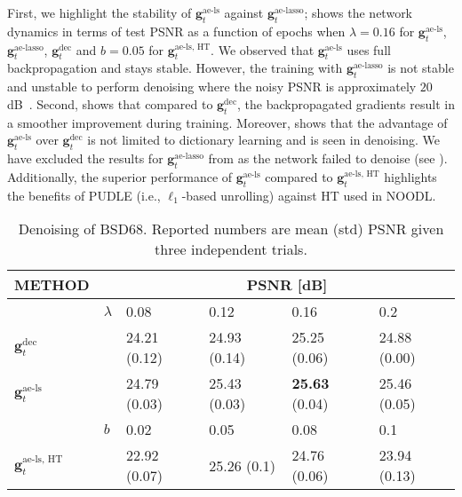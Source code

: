 \documentclass[10pt]{article} %
\newcommand{\g}{{\bm g}}
\begin{document}
First, we highlight the stability of $\g_t^{\text{ae-ls}}$ against $\g_t^{\text{ae-lasso}}$;  shows the network dynamics in terms of test PSNR as a function of epochs when $\lambda = 0.16$ for $\g_t^{\text{ae-ls}}$, $\g_t^{\text{ae-lasso}}$, $\g_t^{\text{dec}}$ and $b=0.05$ for $\g_t^{\text{ae-ls, HT}}$.  We observed that $\g_t^{\text{ae-ls}}$ uses full backpropagation and stays stable. However, the training with $\g_t^{\text{ae-lasso}}$ is not stable and unstable to perform denoising where the noisy PSNR is approximately $20$ dB~\citep{malezieux2022understanding}. Second,  shows that compared to $\g_t^{\text{dec}}$, the backpropagated gradients result in a smoother improvement during training. Moreover,  shows that the advantage of $\g_t^{\text{ae-ls}}$ over $\g_t^{\text{dec}}$ is not limited to dictionary learning and is seen in denoising. We have excluded the results for $\g_t^{\text{ae-lasso}}$ from  as the network failed to denoise (see ). Additionally, the superior performance of $\g_t^{\text{ae-ls}}$ compared to $\g_t^{\text{ae-ls, HT}}$ highlights the benefits of PUDLE (i.e., $\ell_1$-based unrolling) against HT used in NOODL.
 \begin{table}[!h]
 \caption{Denoising of BSD68. Reported numbers are mean (std) PSNR given three independent trials.}
  \label{tab:psnr}
\begin{center}
\begin{tabular}{llllll}
\multicolumn{1}{c}{\bf METHOD} & &\multicolumn{4}{c}{\bf PSNR [dB]}\\
\midrule
 & $\lambda$ &  0.08 & 0.12 & 0.16 & 0.2   \\
  \cmidrule(r){2-6}
$\g_t^{\text{dec}}$ & &  24.21 (0.12) &  24.93 (0.14) &  25.25 (0.06) &  24.88 (0.00)  \\
 $\g_t^{\text{ae-ls}}$  & & 24.79 (0.03) &  25.43 (0.03) &  {\bf 25.63} (0.04) &  25.46 (0.05) \\
\midrule
  & $b$ &  0.02 & 0.05 & 0.08 & 0.1   \\
  \cmidrule(r){2-6}
  $\g_t^{\text{ae-ls, HT}}$  &  &  22.92 (0.07) &  25.26 (0.1) &  24.76 (0.06) &  23.94 (0.13)  \\
\end{tabular}
\end{center}
\end{table}
%
\end{document}
